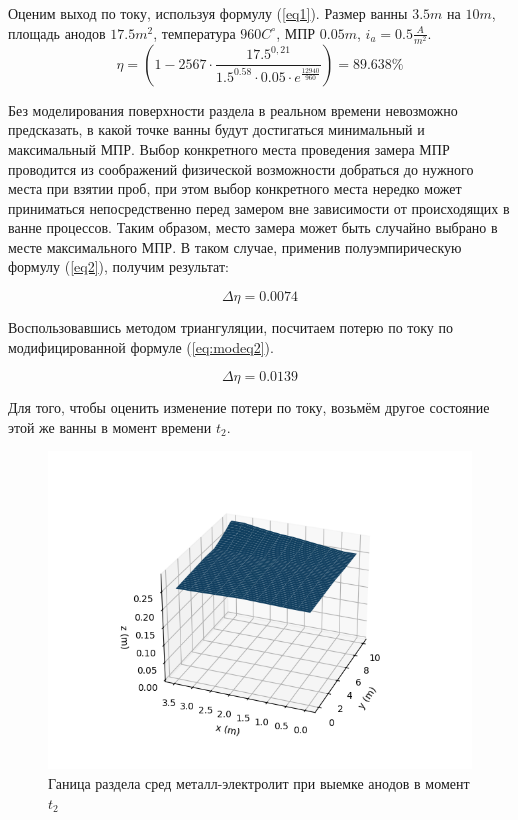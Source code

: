 \documentclass{article}
\begin{document}
Оценим выход по току, используя формулу (\ref{eq1}). Размер ванны $3.5 m$ на $10 m$, площадь анодов $17.5 m^2$, температура $960 C^{\circ}$, МПР $0.05 m$, $i_a = 0.5 \frac{A}{m^2}$.
\begin{equation}
\eta=(1-2567 \cdot \frac{17.5^{0,21}}{1.5^{0.58} \cdot 0.05 \cdot e^{\frac{12940}{960}}}) = 89.638 \%
\end{equation}

Без моделирования поверхности раздела в реальном времени невозможно предсказать, в какой точке ванны будут достигаться минимальный и максимальный МПР. Выбор конкретного места проведения замера МПР проводится из соображений физической возможности добраться до нужного места при взятии проб, при этом выбор конкретного места нередко может приниматься непосредственно перед замером вне зависимости от происходящих в ванне процессов. Таким образом, место замера может быть случайно выбрано в месте максимального МПР. В таком случае, применив полуэмпирическую формулу (\ref{eq2}), получим результат:

\begin{equation}
\Delta \eta = 0.0074
\end{equation}


Воспользовавшись методом триангуляции, посчитаем потерю по току по модифицированной формуле (\ref{eq:modeq2}).

\begin{equation}
\Delta \eta = 0.0139
\end{equation}

Для того, чтобы оценить изменение потери по току, возьмём другое состояние этой же ванны в момент времени $t_2$.

\begin{figure}[H]
\centering
\includegraphics[width=0.8\linewidth]{Surf2.png}
\caption{Ганица раздела сред металл-электролит при выемке анодов в момент $t_2$ \label{fig:anodout-}}
\end{figure}
\end{document}
